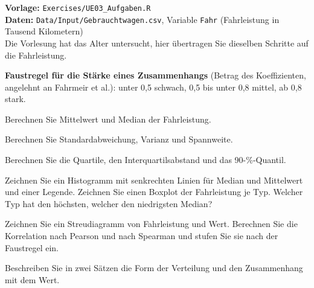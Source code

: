 


\textbf{Vorlage:} \texttt{Exercises/UE03\_Aufgaben.R}\\
\textbf{Daten:} \texttt{Data/Input/Gebrauchtwagen.csv}, Variable \texttt{Fahr} (Fahrleistung in Tausend Kilometern)\\
Die Vorlesung hat das Alter untersucht, hier übertragen Sie dieselben Schritte auf die Fahrleistung.

\textbf{Faustregel für die Stärke eines Zusammenhangs} (Betrag des Koeffizienten, angelehnt an Fahrmeir et al.): unter 0,5 schwach, 0,5 bis unter 0,8 mittel, ab 0,8 stark.

Berechnen Sie Mittelwert und Median der Fahrleistung.

Berechnen Sie Standardabweichung, Varianz und Spannweite.

Berechnen Sie die Quartile, den Interquartilsabstand und das 90-\%-Quantil.

Zeichnen Sie ein Histogramm mit senkrechten Linien für Median und Mittelwert und einer Legende. Zeichnen Sie einen Boxplot der Fahrleistung je Typ. Welcher Typ hat den höchsten, welcher den niedrigsten Median?

Zeichnen Sie ein Streudiagramm von Fahrleistung und Wert. Berechnen Sie die Korrelation nach Pearson und nach Spearman und stufen Sie sie nach der Faustregel ein.

Beschreiben Sie in zwei Sätzen die Form der Verteilung und den Zusammenhang mit dem Wert.



